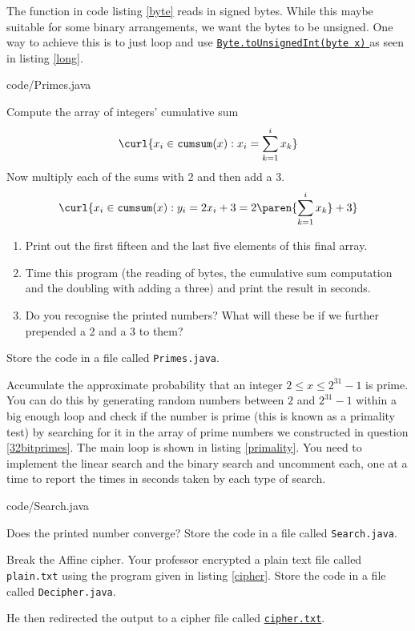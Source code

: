 \documentclass{homework}
\newcommand\callit[1]{Store the code in a file called \texttt{#1}.}
\newcommand\docs{\href{%
    https://tinyurl.com/25w2e4wy%
  }{%
    \texttt{Byte.toUnsignedInt(byte x)}%
  }%
}
\begin{document}
The function in code listing \ref{byte} reads in signed bytes.
While this maybe suitable for some binary arrangements, we want
the bytes to be unsigned. One way to achieve this is to just loop
and use \docs{} as seen in listing \ref{long}.


{code/Primes.java}

Compute the array of integers' cumulative sum \ie
\[
  \curl{x_i \in \mathtt{cumsum}(x) : x_i = \sum_{k=1}^{i} x_k}
\]
Now multiply each of the sums with 2 and then add a 3.
\[
  \curl{x_i \in \mathtt{cumsum}(x) :
    y_i = 2x_i+3 = 2\paren{\sum_{k=1}^{i} x_k}+3}
\]
\begin{enumerate}
  \item Print out the first fifteen and the last five elements of this
        final array.
  \item Time this program (the reading of bytes, the cumulative sum
        computation and the doubling with adding a three) and print the
        result in seconds.
  \item Do you recognise the printed numbers? What will these be if we
        further prepended a 2 and a 3 to them?
\end{enumerate}

\callit{Primes.java}

\question Accumulate the approximate probability that an integer $2 \leq x
  \leq 2^{31}-1$ is prime. You can do this by generating random
numbers between $2$ and $2^{31}-1$ within a big enough loop and
check if the number is prime (this is known as a primality test)
by searching for it in the array of prime numbers we constructed
in
question \ref{32bitprimes}.  The main loop is shown in listing
\ref{primality}.  You need to implement the linear search and the
binary search and uncomment each, one at a time to report the times in
seconds taken by each type of search.


{code/Search.java}

Does the printed number converge? \callit{Search.java}

\question Break the Affine cipher. Your professor encrypted a plain text
file called \texttt{plain.txt} using the program given in listing
\ref{cipher}. \callit{Decipher.java}

He then redirected the output to a cipher file called
\href{https://tinyurl.com/24pjud2t}{\texttt{cipher.txt}}.
\end{document}
